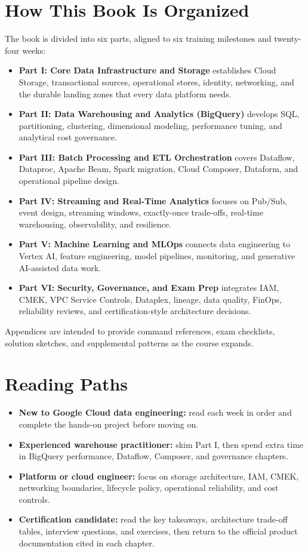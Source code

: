 \section*{How This Book Is Organized}
The book is divided into six parts, aligned to six training milestones and twenty-four weeks:
\begin{itemize}
    \item \textbf{Part I: Core Data Infrastructure and Storage} establishes Cloud Storage, transactional sources, operational stores, identity, networking, and the durable landing zones that every data platform needs.
    \item \textbf{Part II: Data Warehousing and Analytics (BigQuery)} develops SQL, partitioning, clustering, dimensional modeling, performance tuning, and analytical cost governance.
    \item \textbf{Part III: Batch Processing and ETL Orchestration} covers Dataflow, Dataproc, Apache Beam, Spark migration, Cloud Composer, Dataform, and operational pipeline design.
    \item \textbf{Part IV: Streaming and Real-Time Analytics} focuses on Pub/Sub, event design, streaming windows, exactly-once trade-offs, real-time warehousing, observability, and resilience.
    \item \textbf{Part V: Machine Learning and MLOps} connects data engineering to Vertex AI, feature engineering, model pipelines, monitoring, and generative AI-assisted data work.
    \item \textbf{Part VI: Security, Governance, and Exam Prep} integrates IAM, CMEK, VPC Service Controls, Dataplex, lineage, data quality, FinOps, reliability reviews, and certification-style architecture decisions.
\end{itemize}
Appendices are intended to provide command references, exam checklists, solution sketches, and supplemental patterns as the course expands.

\section*{Reading Paths}
\begin{itemize}
    \item \textbf{New to Google Cloud data engineering:} read each week in order and complete the hands-on project before moving on.
    \item \textbf{Experienced warehouse practitioner:} skim Part I, then spend extra time in BigQuery performance, Dataflow, Composer, and governance chapters.
    \item \textbf{Platform or cloud engineer:} focus on storage architecture, IAM, CMEK, networking boundaries, lifecycle policy, operational reliability, and cost controls.
    \item \textbf{Certification candidate:} read the key takeaways, architecture trade-off tables, interview questions, and exercises, then return to the official product documentation cited in each chapter.
\end{itemize}

